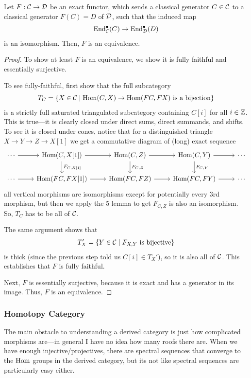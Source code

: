 \documentclass[12pt]{article}
\begin{document}
\begin{lem}
    Let $F:\mathcal{C} \to \mathcal{D}$ be an exact functor, which sends a classical generator $C\in \mathcal{C}$ to a classical generator $F(C)=D$ of $\mathcal{D}$, such that the induced map
    \[\operatorname{End}_{\mathcal{C}}^\bullet(C) \to \operatorname{End}_{\mathcal{D}}^\bullet(D)\]
    is an isomorphism. Then, $F$ is an equivalence.
\end{lem}
\begin{proof}
    To show at least $F$ is an equivalence, we show it is fully faithful and essentially surjective.
    
    To see fully-faithful, first show that the full subcategory
    \[T_C = \{X\in \mathcal{C} \mid \text{$\mathrm{Hom}(C,X) \to \mathrm{Hom}(FC,FX)$ is a bijection}\}\]
    is a strictly full saturated triangulated subcategory containing $C[i]$ for all $i\in \mathbb{Z}$. This is true---it is clearly closed under direct sums, direct summands, and shifts. To see it is closed under cones, notice that for a distinguished triangle $X\to Y\to Z \to X[1]$ we get a commutative diagram of (long) exact sequence
    \[\begin{tikzcd}
        \cdots \rar & \Hom(C,X[1]) \rar \dar["F_{C{,}X[1]}"] & \Hom(C,Z) \rar \dar["F_{C{,}Z}"] & \Hom(C,Y) \rar \dar["F_{C{,}Y}"] & \cdots\\
        \cdots \rar & \Hom(FC,FX[1]) \rar & \Hom(FC,FZ) \rar & \Hom(FC,FY) \rar & \cdots
    \end{tikzcd}\]
    all vertical morphisms are isomorphisms except for potentially every 3rd morphism, but then we apply the 5 lemma to get $F_{C,Z}$ is also an isomorphism. So, $T_C$ has to be all of $\mathcal{C}$.

    The same argument shows that
    \[T_X' = \{Y\in \mathcal{C} \mid F_{X,Y} \text{ is bijective}\}\]
    is thick (since the previous step told us $C[i]\in T_X'$), so it is also all of $\mathcal{C}$. This establishes that $F$ is fully faithful.

    Next, $F$ is essentially surjective, because it is exact and has a generator in its image. Thus, $F$ is an equivalence.
\end{proof}

\subsubsection{Homotopy Category}

The main obstacle to understanding a derived category is just how complicated morphisms are---in general I have no idea how many roofs there are. When we have enough injective/projectives, there are spectral sequences that converge to the $\mathrm{Hom}$ groups in the derived category, but its not like spectral sequences are particularly easy either.
\end{document}
